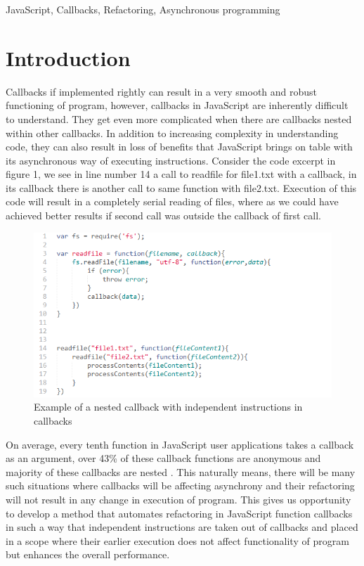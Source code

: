 \documentclass[10pt,conference]{IEEEtran}
\begin{document}
\begin{IEEEkeywords}
JavaScript, Callbacks, Refactoring, Asynchronous programming
\end{IEEEkeywords}

\section{Introduction}
Callbacks if implemented rightly can result in a very smooth and robust functioning of program, however, callbacks in JavaScript are inherently difficult to understand. They get even more complicated when there are callbacks nested within other callbacks. In addition to increasing complexity in understanding code, they can also result in loss of benefits that JavaScript brings on table with its asynchronous way of executing instructions. Consider the code excerpt in figure 1, we see in line number 14 a call to readfile for file1.txt with a callback, in its callback there is another call to same function with file2.txt. Execution of this code will result in a completely serial reading of files, where as we could have achieved better results if second call was outside the callback of first call.
\begin{figure}[htbp]
	\includegraphics[scale=0.5]{introImg1.png}
	\caption{Example of a nested callback with independent instructions in callbacks}
	\label{fig}
\end{figure}

On average, every tenth function in JavaScript user applications takes a callback as an argument, over 43\% of these callback functions are anonymous and majority of these callbacks are nested \cite{b3}. This naturally means, there will be many such situations where callbacks will be affecting asynchrony and their refactoring will not result in any change in execution of program. This gives us opportunity to develop a method that automates refactoring in JavaScript function callbacks in such a way that independent instructions are taken out of callbacks and placed in a scope where their earlier execution does not affect functionality of program but enhances the overall performance.
\end{document}
